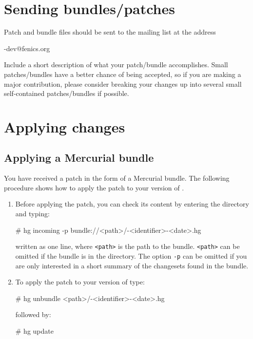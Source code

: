\section{Sending bundles/patches}

Patch and bundle files should be sent to the \package{} mailing list at the address
\begin{macrocode}
\packagett{}-dev@fenics.org
\end{macrocode}
Include a short description of what your patch/bundle accomplishes. Small
patches/bundles have a better chance of being accepted, so if you are making a
major contribution, please consider breaking your changes up into
several small self-contained patches/bundles if possible.

\section{Applying changes}
\subsection{Applying a Mercurial bundle}

You have received a patch in the form of a Mercurial bundle. The following
procedure shows how to apply the patch to your version of \package{}.
\begin{enumerate}
\item Before applying the patch, you can check
  its content by entering the \package{} directory and typing:
  \begin{macrocode}
# hg incoming -p 
  bundle://<path>/\packagett{}-<identifier>-<date>.hg
  \end{macrocode}
  written as one line, where \texttt{<path>} is the path to the
  bundle. \texttt{<path>} can be omitted if the bundle is in the
  \package{} directory.  The option \texttt{-p} can be omitted if you
  are only interested in a short summary of the changesets found in
  the bundle.
\item To apply the patch to your version of \package{} type:
  \begin{macrocode}
# hg unbundle <path>/\packagett{}-<identifier>-<date>.hg
  \end{macrocode}
  followed by:
  \begin{macrocode}
  # hg update
  \end{macrocode}
\end{enumerate}

